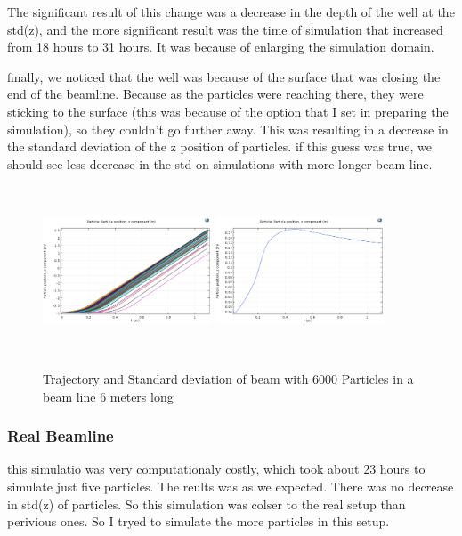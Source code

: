 \documentclass{article}
\begin{document}
The significant result of this change was a decrease in the depth of the well at the std(z), and the more significant result was the time of simulation that increased from 18 hours to 31 hours. It was because of enlarging the simulation domain.

 finally, we noticed that the well was because of the surface that was closing the end of the beamline. Because as the particles were reaching there, they were sticking to the surface (this was because of the option that I set in preparing the simulation), so they couldn't go further away. This was resulting in a decrease in the standard deviation of the z position of particles. if this guess was true, we should see less decrease in the std on simulations with more longer beam line.
 
\begin{figure}[h]
\centering
\includegraphics[width=50mm, height=50mm]{sim-in-100-long}
\includegraphics[width=50mm, height=50mm]{sim-std-100-long}
\caption{Trajectory and Standard deviation of beam with 6000 Particles in a beam line 6 meters long }
\end{figure}
 
\subsubsection{Real Beamline}
this simulatio was very computationaly costly, which took about 23 hours to simulate just five particles. The reults was as we expected. There was no decrease in std(z) of particles. So this simulation was colser to the real setup than perivious ones. So I tryed to simulate the more particles in this setup.
\end{document}
